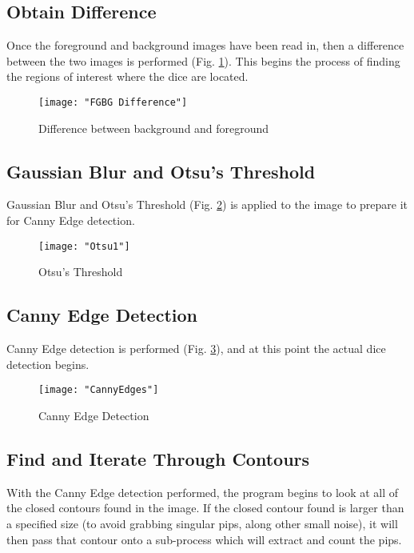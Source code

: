 \documentclass[journal]{IEEEtran}
\begin{document}
\subsection{Obtain Difference}
Once the foreground and background images have been read in, then a difference between the two images is performed (Fig. \ref{fig:fgbg_difference}). This begins the process of finding the regions of interest where the dice are located.\\

\begin{figure}[h]
	\texttt{[image: "FGBG Difference"]}
	\centering
	\caption{Difference between background and foreground}
	\label{fig:fgbg_difference}
\end{figure}


\subsection{Gaussian Blur and Otsu's Threshold}
Gaussian Blur and Otsu's Threshold (Fig. \ref{fig:otsu_threshold}) is applied to the image to prepare it for Canny Edge detection.\\
\begin{figure}[h]
	\texttt{[image: "Otsu1"]}
	\centering
	\caption{Otsu's Threshold}
	\label{fig:otsu_threshold}
\end{figure}

\subsection{Canny Edge Detection}
Canny Edge detection is performed (Fig. \ref{fig:canny_edges}), and at this point the actual dice detection begins.\\
\begin{figure}[h]
	\texttt{[image: "CannyEdges"]}
	\centering
	\caption{Canny Edge Detection}
	\label{fig:canny_edges}
\end{figure}

\subsection{Find and Iterate Through Contours}
With the Canny Edge detection performed, the program begins to look at all of the closed contours found in the image. If the closed contour found is larger than a specified size (to avoid grabbing singular pips, along other small noise), it will then pass that contour onto a sub-process which will extract and count the pips.\\
\end{document}
